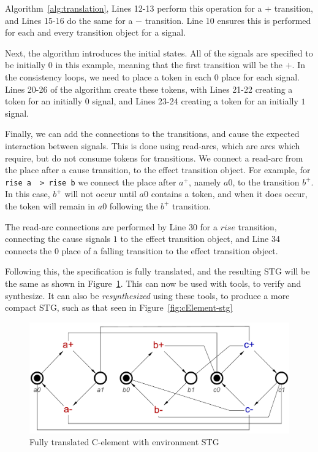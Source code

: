 \documentclass[british,conference,compsoc]{IEEEtran}
\begin{document}
Algorithm~\ref{alg:translation}, Lines 12-13 perform this operation for a $+$ transition,
and Lines 15-16 do the same for a $-$ transition. Line 10 ensures this is performed for 
each and every transition object for a signal.


Next, the algorithm introduces the initial states. All of the signals are 
specified to be initially 0 in this example, meaning that the first transition will be the $+$.
In the consistency loops, we need to place a token 
in each $0$ place for each signal. Lines 20-26 of the algorithm create these tokens,
with Lines 21-22 creating a token for an initially $0$ signal, and Lines 23-24 
creating a token for an initially $1$ signal. 

Finally, we can add the connections to the transitions, and cause the 
expected interaction between signals. This is done using read-arcs, which 
are arcs which require, but do not consume tokens for transitions. We
connect a read-arc from the place after a cause transition, to the effect transition object. 
For example, for \texttt{rise a ~> rise b} we connect the place after $a^{+}$, namely $a0$,
to the transition $b^{+}$. In this case, $b^{+}$ will not occur until $a0$ contains a token,
and when it does occur, the token will remain in $a0$ following the $b^{+}$ transition. 

The read-arc connections are performed by Line 30 for a $rise$ transition, connecting the
cause signals $1$ to the effect transition object, and Line 34 connects the $0$ place of a 
falling transition to the effect transition object. 

Following this, the specification is fully translated, and the resulting STG 
will be the same as shown in Figure~\ref{fig:cElement-stg-translated}. 
This can now be used with tools, to verify and synthesize. It can also be
\emph{resynthesized} using these tools, to produce a more compact STG,
such as that seen in Figure~\ref{fig:cElement-stg}

\begin{figure}[H]
\vspace{-4mm}
\begin{centering}
\includegraphics[scale=0.3]{Images/cElement-stg-translated}
\par\end{centering}
\protect\caption{\label{fig:cElement-stg-translated} Fully translated C-element with environment STG}
\vspace{-4mm}
\end{figure}
\end{document}
